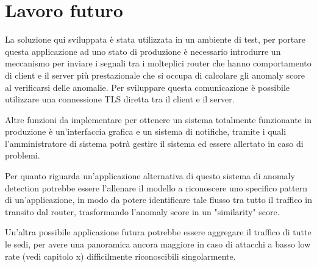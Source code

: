 \chapter{Lavoro futuro}

La soluzione qui sviluppata è stata utilizzata in un ambiente di test, per portare questa applicazione ad uno stato di produzione è necessario introdurre un meccanismo per inviare i segnali tra i molteplici router che hanno comportamento di client e il server più prestazionale che si occupa di calcolare gli anomaly score al verificarsi delle anomalie. Per sviluppare questa comunicazione è possibile utilizzare una connessione TLS diretta tra il client e il server.

Altre funzioni da implementare per ottenere un sistema totalmente funzionante in produzione è un'interfaccia grafica e un sistema di notifiche, tramite i quali l'amministratore di sistema potrà gestire il sistema ed essere allertato in caso di problemi. 



Per quanto riguarda un'applicazione alternativa di questo sistema di anomaly detection potrebbe essere l'allenare il modello a riconoscere uno specifico pattern di un'applicazione, in modo da potere identificare tale flusso tra tutto il traffico in transito dal router, trasformando l'anomaly score in un "similarity" score.

Un'altra possibile applicazione futura potrebbe essere aggregare il traffico di tutte le sedi, per avere una panoramica ancora maggiore in caso di attacchi a basso low rate (vedi capitolo x) difficilmente riconoscibili singolarmente.